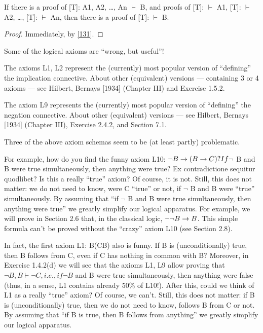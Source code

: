 \begin{cor}[]
If there is a proof of [T]: A1, A2, \ldots , An \(\vdash\) B, and proofs of [T]: \(\vdash\) A1, [T]: \(\vdash\) A2, \ldots , [T]: \(\vdash\)
An, then there is a proof of [T]: \(\vdash\) B.
\end{cor}
\begin{proof}
Immediately, by \cref{131}.
\end{proof}

Some of the logical axioms are ``wrong, but useful''!

The axioms L1, L2 represent the (currently) most popular version of ``defining'' the implication connective. About other (equivalent) versions --- containing 3 or 4 axioms --- see Hilbert, Bernays [1934] (Chapter III) and Exercise 1.5.2.

The axiom L9 represents the (currently) most popular version of ``defining'' the negation connective.
About other (equivalent) versions --- see Hilbert, Bernays [1934] (Chapter III), Exercise 2.4.2, and Section 7.1.

Three of the above axiom schemas seem to be (at least partly) problematic.

For example, how do you find the funny axiom L10: \(\neg B\rightarrow (B\rightarrow C)? If \neg\) B and B were true simultaneously, then anything were true? Ex contradictione sequitur quodlibet? Is this a really ``true'' axiom? Of course, it is not. Still, this does not matter: we do not need to know, were C ``true'' or not, if \(\neg\) B and B were ``true'' simultaneously. By assuming that ``if \(\neg\) B and B were true simultaneously, then anything were true'' we greatly simplify our logical apparatus. For example, we will prove in Section 2.6 that, in the classical logic, \(\neg \neg B\rightarrow B\). This simple formula can't be proved without the ``crazy'' axiom L10 (see Section 2.8).

In fact, the first axiom L1: B\IMPLIES (C\IMPLIES B) also is funny. If B is (unconditionally) true, then B follows from C, even if C has nothing in common with B? Moreover, in Exercise 1.4.2(d) we will see that the axioms L1, L9 allow proving that \(\neg B, B \vdash \neg C, i.e., if \neg B\) and B were true simultaneously, then anything were false (thus, in a sense, L1 contains already 50\% of L10!). After this, could we think of L1 as a really ``true'' axiom? Of course, we can't. Still, this does not matter: if B is (unconditionally) true, then we do not need to know, follows B from C or not. By assuming that ``if B is true, then B follows from anything'' we greatly simplify our logical apparatus.

